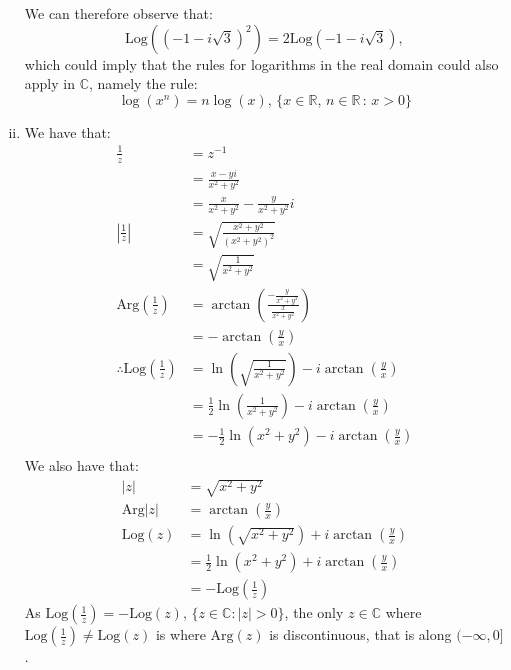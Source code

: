 \documentclass[a4paper, titlepage, DIV=14]{scrartcl}
\newcommand{\Arg}{\text{Arg}}
\newcommand{\Log}{\text{Log}}
\begin{document}
\begin{enumerate}[(i)]
        We can therefore observe that:
        \begin{equation*}
            \Log((-1-i\sqrt{3})^{2}) = 2\Log(-1-i\sqrt{3}),
        \end{equation*}which could imply that the rules for logarithms in the real domain could also apply in $\mathbb{C}$, namely the rule:
        \begin{equation*}
            \log(x^{n}) = n\log(x), \, \{x \in \mathbb{R}, \, n\in \mathbb{R} \, : \, x > 0\}
        \end{equation*}
        
        \item We have that: 
        \begin{align*}
            \frac{1}{z} &= z^{-1} \\
                &= \frac{x-yi}{x^{2}+y^{2}} \\
                &= \frac{x}{x^{2}+y^{2}} - \frac{y}{x^{2}+y^{2}}i \\
            |\frac{1}{z}| &= \sqrt{\frac{x^{2}+y^{2}}{(x^{2}+y^{2})^{2}}} \\
                &= \sqrt{\frac{1}{x^{2}+y^{2}}} \\
            \Arg(\frac{1}{z}) &= \arctan(\frac{-\frac{y}{x^{2}+y^{2}}}{\frac{x}{x^{2}+y^{2}}}) \\
                &= -\arctan(\frac{y}{x}) \\
            \therefore \Log(\frac{1}{z}) &= \ln(\sqrt{\frac{1}{x^{2}+y^{2}}}) - i\arctan(\frac{y}{x}) \\
            &= \frac{1}{2}\ln(\frac{1}{x^{2}+y^{2}}) - i\arctan(\frac{y}{x}) \\
            &= -\frac{1}{2}\ln(x^{2}+y^{2}) - i\arctan(\frac{y}{x}) \\
        \end{align*} 
        We also have that:
        \begin{align*}
            |z| &= \sqrt{x^{2}+y^{2}} \\
            \Arg|z| &= \arctan(\frac{y}{x}) \\
            \Log(z) &= \ln(\sqrt{x^{2}+y^{2}}) + i\arctan(\frac{y}{x}) \\
                    &= \frac{1}{2}\ln(x^{2}+y^{2}) + i\arctan(\frac{y}{x}) \\
                    &= -\Log(\frac{1}{z})
        \end{align*}
        As $\Log(\frac{1}{z}) = -\Log(z), \, \{z \in \mathbb{C} : |z| > 0\}$, the only $z \in \mathbb{C}$ where $\Log(\frac{1}{z}) \neq \Log(z)$ is where
        $\Arg(z)$ is discontinuous, that is along $(-\infty, 0]$. 
    \end{enumerate}
\end{document}
